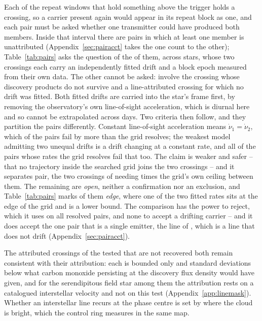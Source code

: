 Each of the \WdNExc{} repeat windows that hold something above the trigger
holds a crossing, so a carrier present again would appear in its repeat block
as one, and each pair must be asked whether one transmitter could have
produced both members. Inside that interval there are
\TjNCandPair{} pairs in which at least
one member is unattributed (Appendix~\ref{sec:pairacct} takes the one count
to the other); Table~\ref{tab:pairs} asks the question of the
\TjNPair{} of them, across \TjNStarPair{} stars, whose two crossings each
carry an independently fitted drift and a block epoch measured from their own
data. The other \TjNCandLost{} cannot be asked: \TjNCandLostSpec{} involve the
crossing whose discovery products do not survive and \TjNCandLostFit{} a
line-attributed crossing for which no drift was fitted. Both fitted drifts are
carried into the star's frame first, by removing the observatory's own
line-of-sight acceleration, which is diurnal here and so cannot be
extrapolated across days. Two criteria then follow, and they partition the
pairs differently. Constant line-of-sight acceleration means
$\dot\nu_1=\dot\nu_2$, which \TjNUneqDrift{} of the \TjNPair{} pairs fail by
more than the grid resolves; the weakest model admitting two unequal drifts
is a drift changing at a constant rate, and all \TjNPower{} of the pairs
whose rates the grid resolves fail that too. The claim is
weaker and safer -- that no trajectory inside the searched grid joins the two crossings
-- and it separates \TjNExcl{} pair, the two crossings of \EcGridStar{}
needing \EcGridFactor{} times the grid's own ceiling between them. The
remaining \TjNOpen{} are \emph{open}, neither a confirmation nor an
exclusion, and Table~\ref{tab:pairs} marks \TjNPairEdge{} of them
\emph{edge}, where one of the two fitted rates sits at the edge of the grid
and is a lower bound. The comparison has the power to reject, which it uses
on all \TjNPower{} resolved pairs, and none to accept a drifting carrier --
and it does accept the one pair that is a single emitter, the \TjCtlLine{}
line of \TjCtlStar, which is a line that does not drift
(Appendix~\ref{sec:pairacct}).

The \MkAttrExcl{} attributed crossings of the \MkAttrTested{} tested that are
not recovered both remain consistent with their attribution: each is bounded
only \RqHrExcl{} and \RqAjExcl{} standard deviations below what carbon
monoxide persisting at the discovery flux density would have given, and for the
serendipitous field star among them the attribution rests on a catalogued
interstellar velocity and not on this test
(Appendix~\ref{app:linemask}). Whether an interstellar line recurs at the
phase centre is set by where the cloud is bright, which the control ring
measures in the same map.

